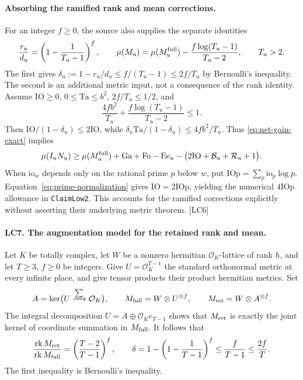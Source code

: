 \documentclass[11pt,a4paper]{article}
\numberwithin{equation}{section}
\theoremstyle{remark}\newtheorem{remark}[theorem]{Remark}
\begin{document}
\paragraph{Absorbing the ramified rank and mean corrections.}
For an integer $f\ge0$, the source also supplies the separate identities
\[
\frac{r_u}{d_u}=\left(1-\frac1{T_u-1}\right)^f,
\qquad
\mu(M_u)=\mu(M_u^{\rm full})-
\frac{f\log(T_u-1)}{T_u-2},\qquad T_u>2.
\]
The first gives $\delta_u:=1-r_u/d_u\le f/(T_u-1)\le2f/T_u$ by Bernoulli's inequality. The second is an additional metric input, not a consequence of the rank identity. Assume $\mathrm{IO}\ge0$, $0\le\mathrm{Ta}\le b^2$, $2f/T_u\le1/2$, and
\[
\frac{4fb^2}{T_u}+\frac{f\log(T_u-1)}{T_u-2}\le1.
\]
Then $\mathrm{IO}/(1-\delta_u)\le2\mathrm{IO}$, while
$\delta_u\mathrm{Ta}/(1-\delta_u)\le4fb^2/T_u$.
Thus \eqref{eq:net-gain-exact} implies
\[
\mu(I_uN_u)\ge\mu(M_u^{\rm full})+\mathrm{Ga}+\mathrm{Fo}-\mathrm{Ee}_u
-\bigl(2\mathrm{IO}+\mathcal B_u+\mathcal R_u+1\bigr).
\]
When $\mathrm{io}_w$ depends only on the rational prime $p$ below $w$, put $\mathrm{IOp}=\sum_p\mathrm{io}_p\log p$. Equation~\eqref{eq:prime-normalization} gives $\mathrm{IO}=2\mathrm{IOp}$, yielding the numerical $4\mathrm{IOp}$ allowance in \texttt{ClaimLow2}. This accounts for the ramified corrections explicitly without asserting their underlying metric theorem. \textsf{[LC6]}

\paragraph{LC7. The augmentation model for the retained rank and mean.}
Let $K$ be totally complex, let $W$ be a nonzero hermitian $\mathcal O_K$-lattice
of rank $h$, and let $T\ge3$, $f\ge0$ be integers.  Give
$U=\mathcal O_K^{T-1}$ the standard orthonormal metric at every infinite
place, and give tensor products their product hermitian metrics.  Set
\[
 A=\ker\bigl(U\xrightarrow{\sum}\mathcal O_K\bigr),\qquad
 M_{\rm full}=W\otimes U^{\otimes f},\qquad
 M_{\rm ret}=W\otimes A^{\otimes f}.
\]
The integral decomposition $U=A\oplus\mathcal O_K e_{T-1}$ shows that
$M_{\rm ret}$ is exactly the joint kernel of coordinate summation in
$M_{\rm full}$.  It follows that
\[
 \frac{\operatorname{rk}M_{\rm ret}}{\operatorname{rk}M_{\rm full}}
 =\left(\frac{T-2}{T-1}\right)^f,
 \qquad
 \delta=1-\left(1-\frac1{T-1}\right)^f
 \le\frac f{T-1}\le\frac{2f}{T}.
\]
The first inequality is Bernoulli's inequality.
\end{document}
